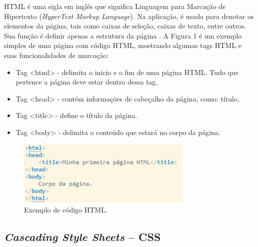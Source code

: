 \documentclass[
	12pt,				%
    oneside,			%
	a4paper,			%
	english,			%
	french,				%
	spanish,			%
	brazil,				%
	]{abntex2}
\begin{document}
HTML é uma sigla em inglês que significa Linguagem para Marcação de
Hipertexto (\textit{HyperText Markup Language}). Na aplicação, é usada para denotar os 
elementos da página, tais como caixas de seleção, caixas de texto, entre outros. Sua função é
definir apenas a estrutura da página \cite{folle}. A Figura 1 é um exemplo simples de uma página com código HTML, mostrando
algumas tags HTML e suas funcionalidades de marcação:
\begin{itemize}

	\item Tag <html> - delimita o início e o fim de uma página HTML. Tudo que pertence a página deve estar dentro dessa tag.
	\item Tag <head> - contém informações de cabeçalho da página, como: título,
	\item Tag <title> - define o título da página.
	\item Tag <body> - delimita o conteúdo que estará no corpo da página.

\end{itemize}

\begin{figure} [hbt] 
\begin{center}
\includegraphics[width=0.75\textwidth]{exhtml.png} %
\end{center}
\label{figura1} 
\caption{Exemplo de código HTML.}
\end{figure}

\subsection{\textit{Cascading Style Sheets} – CSS}
\end{document}
